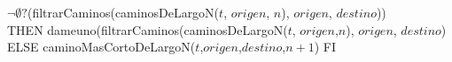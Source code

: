 \begin{tad}{}
 {\IF $\neg\emptyset?$(filtrarCaminos(caminosDeLargoN($t$,
																			$origen$, $n$), $origen$, $destino$))\\
																			THEN dameuno(filtrarCaminos(caminosDeLargoN($t$,
																			$origen$,$n$), $origen$, $destino$) 
																			ELSE caminoMasCortoDeLargoN($t$,$origen$,$destino$,$n+1$) FI}


\end{tad}
